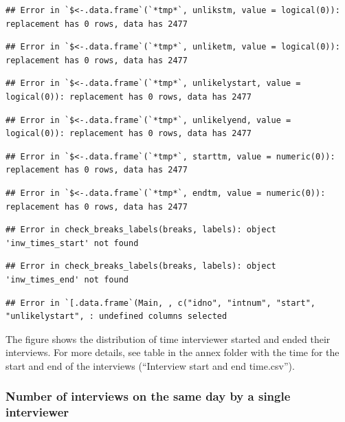 \documentclass[
  11pt,
  a4paperpaper,
]{article}
\begin{document}
\begin{verbatim}
## Error in `$<-.data.frame`(`*tmp*`, unlikstm, value = logical(0)): replacement has 0 rows, data has 2477
\end{verbatim}

\begin{verbatim}
## Error in `$<-.data.frame`(`*tmp*`, unliketm, value = logical(0)): replacement has 0 rows, data has 2477
\end{verbatim}

\begin{verbatim}
## Error in `$<-.data.frame`(`*tmp*`, unlikelystart, value = logical(0)): replacement has 0 rows, data has 2477
\end{verbatim}

\begin{verbatim}
## Error in `$<-.data.frame`(`*tmp*`, unlikelyend, value = logical(0)): replacement has 0 rows, data has 2477
\end{verbatim}

\begin{verbatim}
## Error in `$<-.data.frame`(`*tmp*`, starttm, value = numeric(0)): replacement has 0 rows, data has 2477
\end{verbatim}

\begin{verbatim}
## Error in `$<-.data.frame`(`*tmp*`, endtm, value = numeric(0)): replacement has 0 rows, data has 2477
\end{verbatim}

\begin{verbatim}
## Error in check_breaks_labels(breaks, labels): object 'inw_times_start' not found
\end{verbatim}

\begin{verbatim}
## Error in check_breaks_labels(breaks, labels): object 'inw_times_end' not found
\end{verbatim}

\begin{verbatim}
## Error in `[.data.frame`(Main, , c("idno", "intnum", "start", "unlikelystart", : undefined columns selected
\end{verbatim}

The figure shows the distribution of time interviewer started and ended
their interviews. For more details, see table in the annex folder with
the time for the start and end of the interviews (``Interview start and
end time.csv'').

\hypertarget{sec:number_int}{%
\subsubsection{Number of interviews on the same day by a single
interviewer}\label{sec:number_int}}
\end{document}

